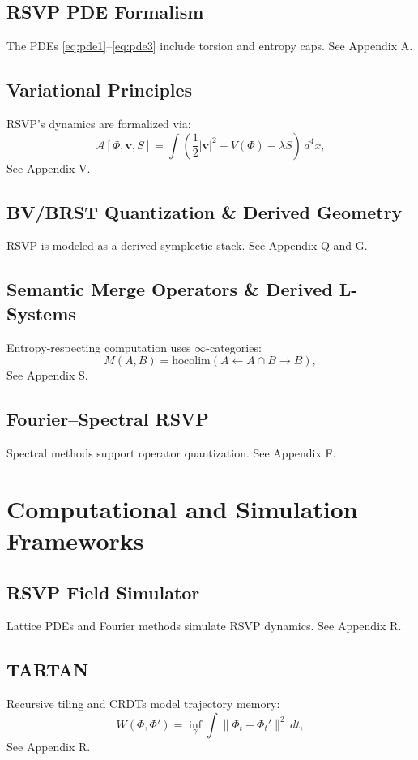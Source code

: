 \documentclass[12pt]{report}
\newcommand{\PhiRSVP}{\Phi}
\newcommand{\vRSVP}{\mathbf{v}}
\newcommand{\SRSVP}{S}
\begin{document}
\chapter{RSVP PDE Formalism}
The PDEs \eqref{eq:pde1}--\eqref{eq:pde3} include torsion and entropy caps. See Appendix A.

\chapter{Variational Principles}
RSVP’s dynamics are formalized via:
\begin{equation}
\mathcal{A}[\PhiRSVP, \vRSVP, \SRSVP] = \int \left( \frac{1}{2} |\vRSVP|^2 - V(\PhiRSVP) - \lambda \SRSVP \right) \, d^4x, \label{eq:action}
\end{equation}
See Appendix V.

\chapter{BV/BRST Quantization \& Derived Geometry}
RSVP is modeled as a derived symplectic stack. See Appendix Q and G.

\chapter{Semantic Merge Operators \& Derived L-Systems}
Entropy-respecting computation uses \(\infty\)-categories:
\begin{equation}
M(A, B) = \mathrm{hocolim}(A \leftarrow A \cap B \to B), \label{eq:merge}
\end{equation}
See Appendix S.

\chapter{Fourier–Spectral RSVP}
Spectral methods support operator quantization. See Appendix F.

\part{Computational and Simulation Frameworks}

\chapter{RSVP Field Simulator}
Lattice PDEs and Fourier methods simulate RSVP dynamics. See Appendix R.

\chapter{TARTAN}
Recursive tiling and CRDTs model trajectory memory:
\begin{equation}
W(\PhiRSVP, \PhiRSVP') = \inf_{\gamma} \int \|\PhiRSVP_t - \PhiRSVP_t'\|^2 \, dt, \label{eq:wasserstein}
\end{equation}
See Appendix R.
\end{document}
